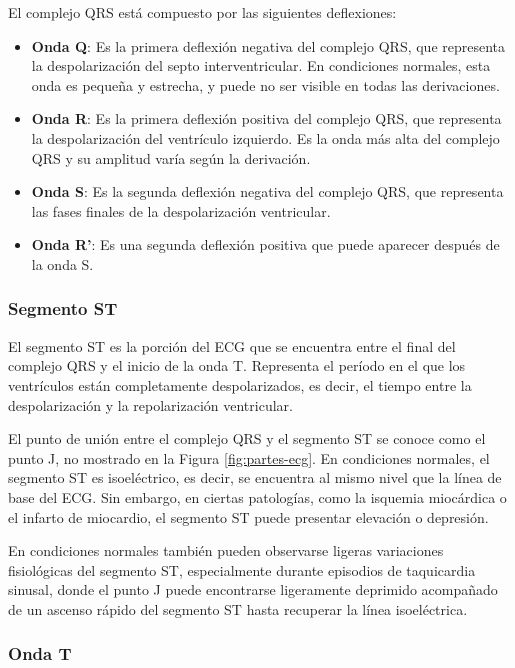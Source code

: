 \documentclass[12pt,a4paper,twoside]{book}
\begin{document}
El complejo QRS está compuesto por las siguientes deflexiones:
\begin{itemize}
	\item \textbf{Onda Q}: Es la primera deflexión negativa del complejo QRS, que representa la despolarización del septo interventricular. En condiciones normales, esta onda es pequeña y estrecha, y puede no ser visible en todas las derivaciones.
	\item \textbf{Onda R}: Es la primera deflexión positiva del complejo QRS, que representa la despolarización del ventrículo izquierdo. Es la onda más alta del complejo QRS y su amplitud varía según la derivación.
	\item \textbf{Onda S}: Es la segunda deflexión negativa del complejo QRS, que representa las fases finales de la despolarización ventricular.
	\item \textbf{Onda R'}: Es una segunda deflexión positiva que puede aparecer después de la onda S.
\end{itemize}

\subsubsection*{Segmento ST}

El segmento ST es la porción del ECG que se encuentra entre el final del complejo QRS y el inicio de la onda T. Representa el período en el que los ventrículos están completamente despolarizados, es decir, el tiempo entre la despolarización y la repolarización ventricular.

El punto de unión entre el complejo QRS y el segmento ST se conoce como el punto J, no mostrado en la Figura \ref{fig:partes-ecg}. 
En condiciones normales, el segmento ST es isoeléctrico, es decir, se encuentra al mismo nivel que la línea de base del ECG. 
Sin embargo, en ciertas patologías, como la isquemia miocárdica o el infarto de miocardio, el segmento ST puede presentar elevación o depresión.

En condiciones normales también pueden observarse ligeras variaciones fisiológicas del segmento ST, especialmente durante episodios de taquicardia sinusal, donde el punto J puede encontrarse ligeramente deprimido acompañado de un ascenso rápido del segmento ST hasta recuperar la línea isoeléctrica.


\subsubsection*{Onda T}
\end{document}
